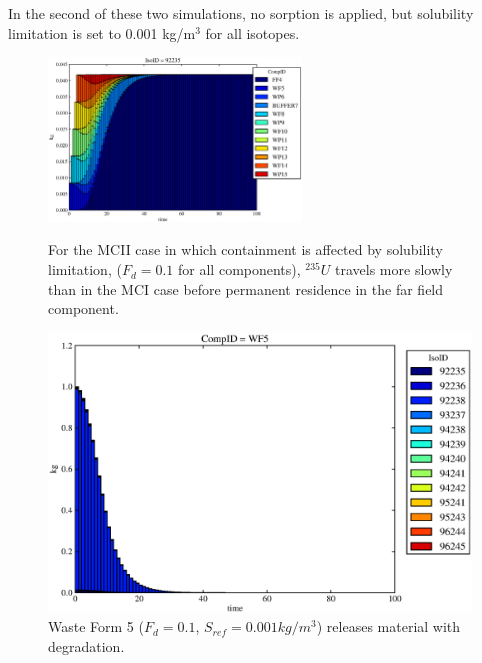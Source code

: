 
In the second of these two simulations, no sorption is applied, but solubility 
limitation is set to 0.001 kg/m$^3$ for all isotopes. 

\begin{figure}[ht]
\centering
\includegraphics[width=0.6\textwidth]{./mcIII.eps}
\caption[$^{235}U$ residence. Mixed Cell Coupled Sorption and Solubility Limitation.]{
For the MCII case in which containment is affected by solubility limitation, 
($F_{d}=0.1$ for all components), $^{235}U$ travels more slowly than in the MCI case 
before permanent residence in the far field component.
}
\label{fig:mcIIIall}
\begin{minipage}[b]{0.45\linewidth}

  \includegraphics[width=\textwidth]{./mcIII1.eps}
  \caption[Case MCII Waste Form Contaminants.]{
    Waste Form 5 ($F_d = 0.1$, $S_{ref} = 0.001kg/m^3$) releases material with degradation. 
    }
  \label{fig:mcIIIwf5}
  

\end{minipage}
\end{figure}
